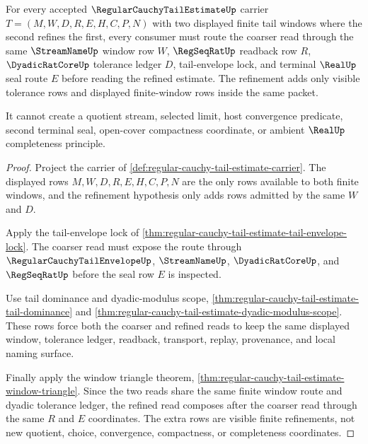 \begin{theorem}
\label{thm:regular-cauchy-tail-estimate-window-monotone-nesting}
For every accepted $\RegularCauchyTailEstimateUp$ carrier
$T=(M,W,D,R,E,H,C,P,N)$ with two displayed finite tail windows where the
second refines the first, every consumer must route the coarser read through
the same $\StreamNameUp$ window row $W$, $\RegSeqRatUp$ readback row $R$,
$\DyadicRatCoreUp$ tolerance ledger $D$, tail-envelope lock, and terminal
$\RealUp$ seal route $E$ before reading the refined estimate. The refinement
adds only visible tolerance rows and displayed finite-window rows inside the
same packet.

It cannot create a quotient stream, selected limit, host convergence
predicate, second terminal seal, open-cover compactness coordinate, or ambient
$\RealUp$ completeness principle.
\end{theorem}
\begin{proof}
Project the carrier of
\autoref{def:regular-cauchy-tail-estimate-carrier}. The displayed rows
$M,W,D,R,E,H,C,P,N$ are the only rows available to both finite windows, and
the refinement hypothesis only adds rows admitted by the same $W$ and $D$.

Apply the tail-envelope lock of
\autoref{thm:regular-cauchy-tail-estimate-tail-envelope-lock}. The coarser
read must expose the route through $\RegularCauchyTailEnvelopeUp$,
$\StreamNameUp$, $\DyadicRatCoreUp$, and $\RegSeqRatUp$ before the seal row
$E$ is inspected.

Use tail dominance and dyadic-modulus scope,
\autoref{thm:regular-cauchy-tail-estimate-tail-dominance} and
\autoref{thm:regular-cauchy-tail-estimate-dyadic-modulus-scope}. These rows
force both the coarser and refined reads to keep the same displayed window,
tolerance ledger, readback, transport, replay, provenance, and local naming
surface.

Finally apply the window triangle theorem,
\autoref{thm:regular-cauchy-tail-estimate-window-triangle}. Since the two
reads share the same finite window route and dyadic tolerance ledger, the
refined read composes after the coarser read through the same $R$ and $E$
coordinates. The extra rows are visible finite refinements, not new quotient,
choice, convergence, compactness, or completeness coordinates.
\end{proof}

